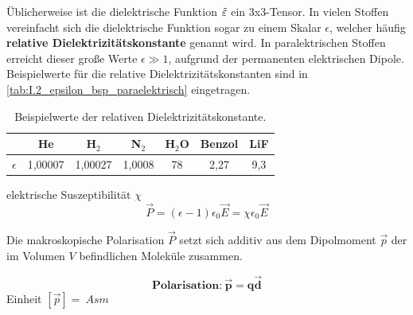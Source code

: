     Üblicherweise ist die dielektrische Funktion $\tilde{\varepsilon}$ ein 3x3-Tensor. In vielen Stoffen vereinfacht sich die dielektrische Funktion sogar zu einem Skalar $\epsilon$, welcher häufig \textbf{relative Dielektrizitätskonstante} genannt wird. 
    In paralektrischen Stoffen erreicht dieser große Werte $\epsilon\gg1$, aufgrund der permanenten elektrischen Dipole. 
    Beispielwerte für die relative Dielektrizitätskonstanten sind in \autoref{tab:I.2_epsilon_bsp_paraelektrisch} eingetragen.
    \begin{table}[H]
        \centering
        \caption{Beispielwerte der relativen Dielektrizitätskonstante.}
        \begin{tabular}{|l||cccccc|}\hline
             &He&H${}_2$&N${}_2$&H${}_2$O&Benzol&LiF \\\hline
             $\epsilon$&1,00007&1,00027&1,0008&78&2,27&9,3\\\hline
        \end{tabular}
        \label{tab:I.2_epsilon_bsp_paraelektrisch}
    \end{table}
    \begin{definition}{elektrische Suszeptibilität $\chi$}
        \begin{equation}
            \vec P = (\epsilon-1)\epsilon_0\vec E = \chi\epsilon_0\vec E
            \label{eq:2.3}
        \end{equation}
    \end{definition}
    Die makroskopische Polarisation $\vec P$ setzt sich additiv aus dem Dipolmoment $\vec p$ der im Volumen $V$ befindlichen Moleküle zusammen.\\
    \begin{minipage}{0.6\linewidth}\vspace{3em}\hspace{1em}
        \centering
        
        \label{fig:vl02_dipol}
    \end{minipage}
    \begin{minipage}{0.4\linewidth}
        \begin{important}
            \begin{equation}
                \textbf{Polarisation:}~\bm{\vec p= q\vec d}
            \end{equation}
            Einheit $[\vec p]=\SI{}{Asm}$
        \end{important}
    \end{minipage}

